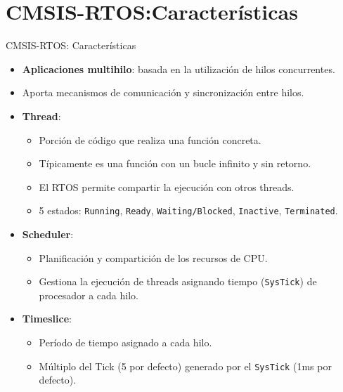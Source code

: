 \section{CMSIS-RTOS:Características}
\begin{frame}{CMSIS-RTOS: Características}
    \begin{itemize}
  \item \textbf{Aplicaciones multihilo}: basada en la utilización de hilos concurrentes.
  \item Aporta mecanismos de comunicación y sincronización entre hilos.
  \item \textbf{Thread}:
    \begin{itemize}
        \item Porción de código que realiza una función concreta.
        \item Típicamente es una función con un bucle infinito y sin retorno.
        \item El RTOS permite compartir la ejecución con otros threads.
        \item 5 estados: \texttt{Running}, \texttt{Ready}, \texttt{Waiting/Blocked}, \texttt{Inactive}, \texttt{Terminated}.
    \end{itemize}
  \item \textbf{Scheduler}:
    \begin{itemize}
        \item Planificación y compartición de los recursos de CPU.
        \item Gestiona la ejecución de threads asignando tiempo (\texttt{SysTick}) de procesador a cada hilo.
    \end{itemize}
  \item \textbf{Timeslice}:
    \begin{itemize}
        \item Período de tiempo asignado a cada hilo.
        \item Múltiplo del Tick (5 por defecto) generado por el \texttt{SysTick} (1ms por defecto).
    \end{itemize}
\end{itemize}

\end{frame}

